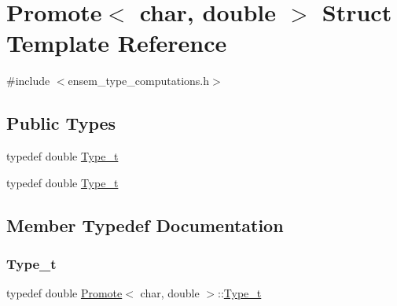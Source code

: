 \hypertarget{structPromote_3_01char_00_01double_01_4}{}\section{Promote$<$ char, double $>$ Struct Template Reference}
\label{structPromote_3_01char_00_01double_01_4}


{\ttfamily \#include $<$ensem\+\_\+type\+\_\+computations.\+h$>$}

\subsection*{Public Types}
\begin{DoxyCompactItemize}
\item 
typedef double \mbox{\hyperlink{structPromote_3_01char_00_01double_01_4_ac5f86ae4e12f2be8737cfb818bd7d82d}{Type\+\_\+t}}
\item 
typedef double \mbox{\hyperlink{structPromote_3_01char_00_01double_01_4_ac5f86ae4e12f2be8737cfb818bd7d82d}{Type\+\_\+t}}
\end{DoxyCompactItemize}


\subsection{Member Typedef Documentation}
\mbox{\label{structPromote_3_01char_00_01double_01_4_ac5f86ae4e12f2be8737cfb818bd7d82d}} 
\subsubsection{\texorpdfstring{Type\_t}{Type\_t}\hspace{0.1cm}{\footnotesize\ttfamily [1/2]}}
{\footnotesize\ttfamily typedef double \mbox{\hyperlink{structPromote}{Promote}}$<$ char, double $>$\+::\mbox{\hyperlink{structPromote_3_01char_00_01double_01_4_ac5f86ae4e12f2be8737cfb818bd7d82d}{Type\+\_\+t}}}

\mbox{\label{structPromote_3_01char_00_01double_01_4_ac5f86ae4e12f2be8737cfb818bd7d82d}} 
